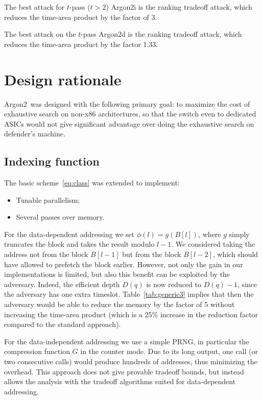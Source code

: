 \documentclass[a4paper]{article}
\begin{document}
The best attack for $t$-pass ($t>2$) Argon2i is the ranking tradeoff attack, which reduces the time-area product by the factor of 3.

The best attack on the $t$-pass Argon2d is the ranking tradeoff attack, which reduces the time-area product by the factor 1.33. 


  \section{Design rationale}

  \textsf{Argon2}\ was designed with the following primary goal: to maximize the cost of exhaustive search on non-x86 architectures, so that the switch even to dedicated ASICs would not give significant advantage over doing the exhaustive search on defender's machine.




 \subsection{Indexing function}  

The basic scheme~\eqref{eq:class} was extended to implement:
\begin{itemize}
  \item Tunable parallelism;
  \item Several passes over memory.
\end{itemize}





  For the data-dependent addressing we set $\phi(l) = g(B[l])$, where $g$ simply truncates the block and takes the result modulo $l-1$. We considered
 taking the address
  not from the block $B[l-1]$ but from the block $B[l-2]$, which should have allowed to prefetch the block earlier. However, not only the gain in our implementations is limited, but also this benefit can be exploited by the adversary. Indeed, the efficient depth $D(q)$ is
 now reduced to $D(q)-1$, since the adversary has one extra timeslot. Table~\ref{tab:generic3} implies that then the adversary would be able to reduce the memory by the factor of 5 without increasing the time-area product (which is a 25\% increase in the reduction factor compared to the standard approach).



 For the data-independent addressing we use a simple PRNG, in particular the compression function $G$ in the counter mode.
  Due to its long output, one call (or two consecutive calls) would produce hundreds of addresses,
 thus minimizing the overhead. This approach does not give provable tradeoff bounds, but instead allows
 the analysis with the  tradeoff algorithms suited for data-dependent addressing.
\end{document}
